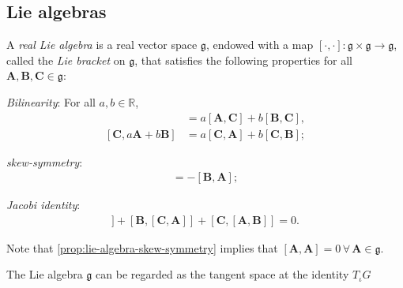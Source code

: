 \subsection{Lie algebras}
\begin{definition}
    A \emph{real Lie algebra} is a real vector space $\mathfrak{g}$, endowed with a map $[\cdot, \cdot]:\mathfrak{g}\times\mathfrak{g}\to\mathfrak{g}$, called the \emph{Lie bracket} on $\mathfrak{g}$, that satisfies the following properties for all $\mathbf{A},\mathbf{B},\mathbf{C}\in\mathfrak{g}$:
    \begin{property}
        \item \emph{Bilinearity}: For all $a,b\in\mathbb{R}$,
        \begin{align*}
            [a\mathbf{A}+b\mathbf{B}, \mathbf{C}] &= a[\mathbf{A}, \mathbf{C}] + b[\mathbf{B}, \mathbf{C}], \\
             [\mathbf{C}, a\mathbf{A}+b\mathbf{B}] &= a[\mathbf{C}, \mathbf{A}] + b[\mathbf{C}, \mathbf{B}];
        \end{align*}
        \item \emph{skew-symmetry}: 
        \begin{align*}
            [\mathbf{A}, \mathbf{B}] = -[\mathbf{B}, \mathbf{A}];
        \end{align*} \label{prop:lie-algebra-skew-symmetry}
        \item \emph{Jacobi identity}:
        \begin{align*}
            [\mathbf{A}, [\mathbf{B}, \mathbf{C}]] + [\mathbf{B}, [\mathbf{C}, \mathbf{A}]] + [\mathbf{C}, [\mathbf{A}, \mathbf{B}]] = 0.
        \end{align*}
    \end{property}
\end{definition}
Note that \cref{prop:lie-algebra-skew-symmetry} implies that $[\mathbf{A}, \mathbf{A}]=0\,\forall\,\mathbf{A}\in\mathfrak{g}$. 

The Lie algebra $\mathfrak{g}$ can be regarded as the tangent space at the identity $T_\iota G$

